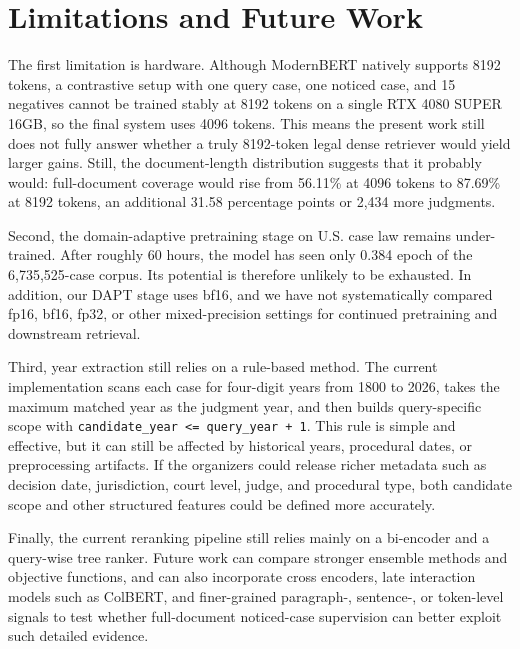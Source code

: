 \section{Limitations and Future Work}

The first limitation is hardware. Although ModernBERT natively supports 8192 tokens, a contrastive setup with one query case, one noticed case, and 15 negatives cannot be trained stably at 8192 tokens on a single RTX 4080 SUPER 16GB, so the final system uses 4096 tokens. This means the present work still does not fully answer whether a truly 8192-token legal dense retriever would yield larger gains. Still, the document-length distribution suggests that it probably would: full-document coverage would rise from 56.11\% at 4096 tokens to 87.69\% at 8192 tokens, an additional 31.58 percentage points or 2,434 more judgments.

Second, the domain-adaptive pretraining stage on U.S. case law remains under-trained. After roughly 60 hours, the model has seen only 0.384 epoch of the 6,735,525-case corpus. Its potential is therefore unlikely to be exhausted. In addition, our DAPT stage uses bf16, and we have not systematically compared fp16, bf16, fp32, or other mixed-precision settings for continued pretraining and downstream retrieval.

Third, year extraction still relies on a rule-based method. The current implementation scans each case for four-digit years from 1800 to 2026, takes the maximum matched year as the judgment year, and then builds query-specific scope with \texttt{candidate\_year <= query\_year + 1}. This rule is simple and effective, but it can still be affected by historical years, procedural dates, or preprocessing artifacts. If the organizers could release richer metadata such as decision date, jurisdiction, court level, judge, and procedural type, both candidate scope and other structured features could be defined more accurately.

Finally, the current reranking pipeline still relies mainly on a bi-encoder and a query-wise tree ranker. Future work can compare stronger ensemble methods and objective functions, and can also incorporate cross encoders, late interaction models such as ColBERT, and finer-grained paragraph-, sentence-, or token-level signals to test whether full-document noticed-case supervision can better exploit such detailed evidence.
